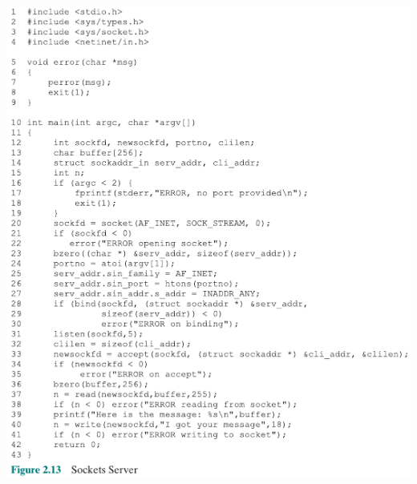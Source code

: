 \documentclass[pdflatex,compress]{beamer}
\begin{document}
\begin{frame}
	\begin{center}
		\includegraphics[height=0.9\textheight]{img/img18}
	\end{center}
\end{frame}
\end{document}
